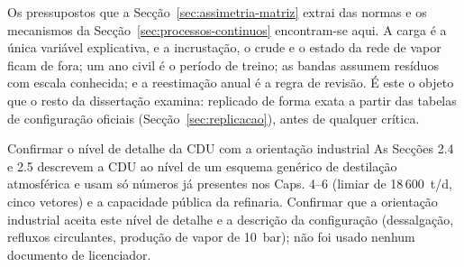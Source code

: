 Os pressupostos que a Secção~\ref{sec:assimetria-matriz} extrai das normas e
os mecanismos da Secção~\ref{sec:processos-continuos} encontram-se aqui. A
carga é a única variável explicativa, e a incrustação, o crude e o estado da
rede de vapor ficam de fora; um ano civil é o período de treino; as bandas
assumem resíduos com escala conhecida; e a reestimação anual é a regra de
revisão. É este o objeto que o resto da dissertação examina: replicado de
forma exata a partir das tabelas de configuração oficiais
(Secção~\ref{sec:replicacao}), antes de qualquer crítica.

{Confirmar o nível de detalhe da CDU com a orientação industrial}
{As Secções 2.4 e 2.5 descrevem a CDU ao nível de um esquema genérico de
destilação atmosférica e usam só números já presentes nos Caps. 4--6
(limiar de 18\,600~t/d, cinco vetores) e a capacidade pública da refinaria.
Confirmar que a orientação industrial aceita este nível de detalhe e a
descrição da configuração (dessalgação, refluxos circulantes, produção de
vapor de 10~bar); não foi usado nenhum documento de licenciador.}%

